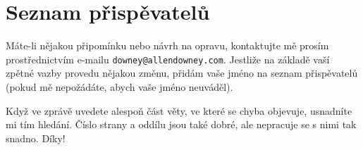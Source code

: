 \documentclass[12pt]{book}
\begin{document}



\section*{Seznam přispěvatelů}

Máte-li nějakou připomínku nebo návrh na opravu, kontaktujte mě prosím prostřednictvím e-mailu
{\tt downey@allendowney.com}. Jestliže na základě vaší zpětné vazby provedu nějakou změnu, přidám vaše jméno na seznam přispěvatelů (pokud mě nepožádáte, abych vaše jméno neuváděl).

Když ve zprávě uvedete alespoň část věty, ve které se chyba objevuje, usnadníte mi tím hledání. Číslo strany a oddílu jsou také dobré, ale nepracuje se s nimi tak snadno.
Díky!

\small
\end{document}
